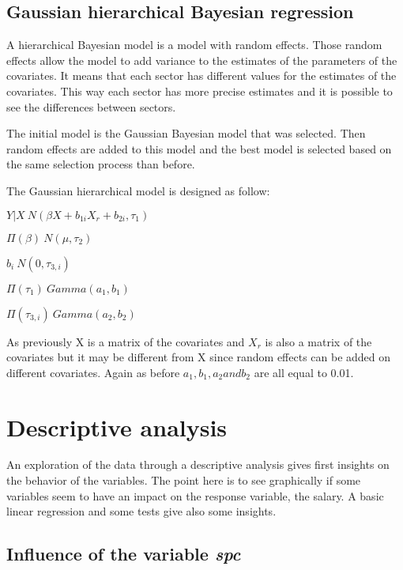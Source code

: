 \documentclass[]{article}
\begin{document}
\subsection{Gaussian hierarchical Bayesian
regression}\label{gaussian-hierarchical-bayesian-regression}

A hierarchical Bayesian model is a model with random effects. Those
random effects allow the model to add variance to the estimates of the
parameters of the covariates. It means that each sector has different
values for the estimates of the covariates. This way each sector has
more precise estimates and it is possible to see the differences between
sectors.

The initial model is the Gaussian Bayesian model that was selected. Then
random effects are added to this model and the best model is selected
based on the same selection process than before.

The Gaussian hierarchical model is designed as follow:

\begin{centering}

  $Y|X ~ N(\beta X + b_{1i} X_r + b_{2i},\tau_1)$
  
  $\Pi(\beta) ~ N(\mu,\tau_2)$
  
  $b_i ~N(0,\tau_{3,i})$
  
  $\Pi(\tau_1) ~ Gamma(a_1,b_1)$
  
  $\Pi(\tau_{3,i}) ~ Gamma(a_2,b_2)$

\end{centering}

As previously X is a matrix of the covariates and \(X_r\) is also a
matrix of the covariates but it may be different from X since random
effects can be added on different covariates. Again as before
\(a_1, b_1, a_2 and b_2\) are all equal to 0.01.

\newpage

\section{Descriptive analysis}\label{descriptive-analysis}

An exploration of the data through a descriptive analysis gives first
insights on the behavior of the variables. The point here is to see
graphically if some variables seem to have an impact on the response
variable, the salary. A basic linear regression and some tests give also
some insights.

\subsection{Influence of the variable
\emph{spc}}\label{influence-of-the-variable-spc}
\end{document}
